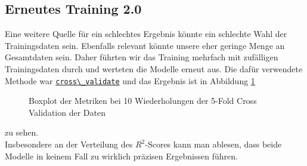 \documentclass[a4paper,10pt]{scrartcl}
\begin{document}
\subsection{Erneutes Training 2.0}
Eine weitere Quelle für ein schlechtes Ergebnis könnte ein schlechte Wahl der Trainingsdaten sein. Ebenfalls relevant könnte unsere eher geringe Menge an Gesamtdaten sein. Daher führten wir das Training mehrfach mit zufälligen Trainingsdaten durch und werteten die Modelle erneut aus. Die dafür verwendete Methode war  \href{https://scikit-learn.org/stable/modules/generated/sklearn.model_selection.cross_validate.html}{\lstinline|cross\_validate|} und das Ergebnis ist in Abbildung \ref{fig:crossval}
\begin{figure}[h]
	\centering
	\caption{Boxplot der Metriken bei 10 Wiederholungen der 5-Fold Cross Validation der Daten}
	\label{fig:crossval}
\end{figure} zu sehen. \\
 Insbesondere an der Verteilung des $R^2$-Scores kann man ablesen, dass beide Modelle in keinem Fall zu wirklich präzisen Ergebnissen führen. 
\end{document}
